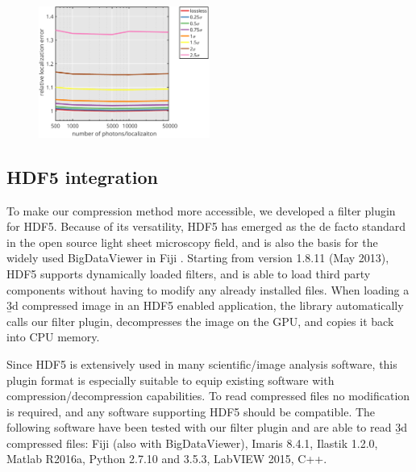     \begin{figure}[tpb]
      \centering
      \includegraphics[page=1,width=0.5\textwidth]{SFig6_locprecVsNphotons}
      \label{fig:SFig6_locprecVsNphotons}
    \end{figure}



  

  \subsection{HDF5 integration}
  To make our compression method more accessible, we developed a filter plugin for HDF5. Because of its versatility, HDF5 has emerged as the de facto standard in the open source light sheet microscopy field, and is also the basis for the widely used BigDataViewer \cite{pietzsch_bigdataviewer:_2015} in Fiji \cite{schindelin_fiji:_2012}. Starting from version 1.8.11 (May 2013), HDF5 supports dynamically loaded filters, and is able to load third party components without having to modify any already installed files. When loading a \b3d compressed image in an HDF5 enabled application, the library automatically calls our filter plugin, decompresses the image on the GPU, and copies it back into CPU memory.
  
  Since HDF5 is extensively used in many scientific/image analysis software, this plugin format is especially suitable to equip existing software with compression/decompression capabilities. To read compressed files no modification is required, and any software supporting HDF5 should be compatible. The following software have been tested with our filter plugin and are able to read \b3d compressed files:
  Fiji (also with BigDataViewer), Imaris 8.4.1, Ilastik 1.2.0, Matlab R2016a, Python 2.7.10 and 3.5.3, LabVIEW 2015, C++.
  
